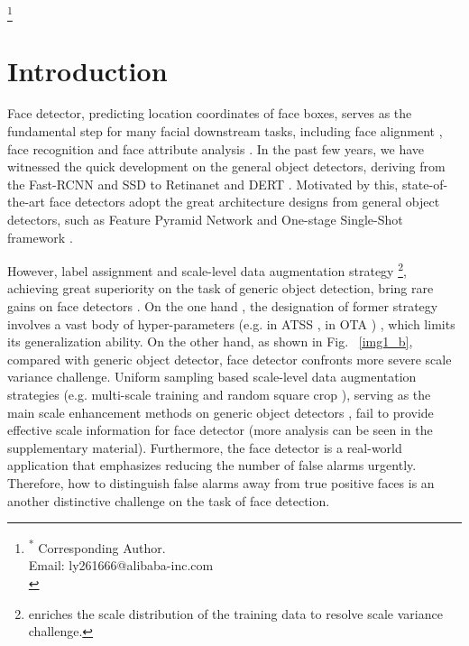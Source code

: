 \documentclass[10pt,twocolumn,letterpaper]{article}
\newcommand\blfootnote[1]{\begingroup
\renewcommand\thefootnote{}\footnote{#1}\addtocounter{footnote}{-1}\endgroup
}
\begin{document}
\blfootnote{\textsuperscript{*} Corresponding Author. \\
\qquad Email:  ly261666@alibaba-inc.com\\
} 
\section{Introduction}

\label{sec:introduction}
Face detector, predicting location coordinates of face boxes, serves as the fundamental step for many facial downstream tasks, including face alignment \cite{bulat2017far}, face recognition \cite{deng1801arcface} \cite{wang2021efficient} and face attribute analysis \cite{shu2021learning}. In the past few years, we have witnessed the quick development on the general object detectors, deriving from the Fast-RCNN \cite{girshick2015fast} and SSD \cite{liu2016ssd} to Retinanet \cite{lin2017focal} and DERT \cite{carion2020end}. 
Motivated by this, 
 state-of-the-art face detectors adopt the great architecture designs from general object detectors, such as Feature Pyramid Network \cite{lin2017feature} and One-stage Single-Shot framework \cite{lin2017focal}. 


However, label assignment and scale-level data augmentation strategy \footnote{enriches the scale distribution of the training data to resolve scale variance challenge.}, achieving great superiority on the task of generic object detection, bring rare gains on face detectors . On the one hand , the designation of former strategy involves a vast body of hyper-parameters (e.g.  in ATSS \cite{zhang2020bridging},  in OTA \cite{ge2021ota} ) , which limits its generalization ability.
 On the other hand, as shown in Fig. ~\ref{img1_b}, compared with generic object detector, face detector confronts more severe scale variance challenge. Uniform sampling based scale-level data augmentation strategies (e.g. multi-scale training  and random square crop \cite{liu2016ssd}), serving as the main scale enhancement methods on generic object detectors \cite{ren2015faster, lin2017focal, zhang2020bridging},  fail to provide effective scale information for face detector (more analysis can be seen in the supplementary material).
Furthermore, the face detector is a real-world application that emphasizes reducing the number of false alarms urgently. Therefore, how to distinguish false alarms away from true positive faces is an another distinctive challenge on the task of face detection.
 
\end{document}
